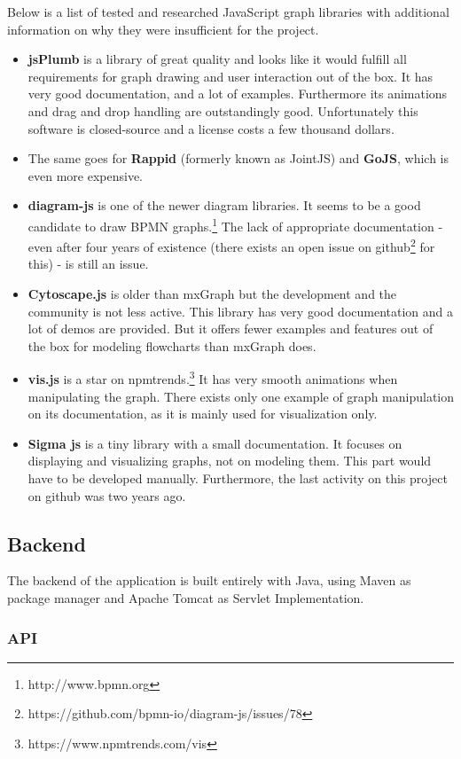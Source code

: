 \documentclass[a4paper,top=25mm,bottom=25mm,12pt,pdftex,halfparskip,twoside,openany,bibtotoc,numbers=noenddot]{scrbook}
\begin{document}
Below is a list of tested and researched JavaScript graph libraries with additional information on why they were insufficient for the project.
\begin{itemize}
	\item \textbf{jsPlumb} is a library of great quality and looks like it would fulfill all  requirements for graph drawing and user interaction out of the box. It has very good documentation, and a lot of examples. Furthermore its animations and drag and drop handling are outstandingly good. Unfortunately this software is closed-source and a license costs a few thousand dollars.
	\item The same goes for \textbf{Rappid} (formerly known as JointJS) and \textbf{GoJS}, which is even more expensive.
	\item \textbf{diagram-js} is one of the newer diagram libraries. It seems to be a good candidate to draw BPMN graphs.\footnote{http://www.bpmn.org} The lack of appropriate documentation - even after four years of existence (there exists an open issue on github\footnote{https://github.com/bpmn-io/diagram-js/issues/78} for this) - is still an issue.
	\item \textbf{Cytoscape.js} is older than mxGraph but the development and the community is not less active. This library has very good documentation and a lot of demos are provided. But it offers fewer examples and features out of the box for modeling flowcharts than mxGraph does.
	\item \textbf{vis.js} is a star on npmtrends.\footnote{https://www.npmtrends.com/vis}  It has very smooth animations when manipulating the graph. There exists only one example of graph manipulation on its documentation, as it is mainly used for visualization only.
	\item \textbf{Sigma js} is a tiny library with a small documentation. It focuses on displaying and visualizing graphs, not on modeling them. This part would have to be developed manually. Furthermore, the last activity on this project on github was two years ago.
\end{itemize}


\subsection{Backend}

The backend  of the application is built entirely with Java, using Maven as package manager and Apache Tomcat as Servlet Implementation.

\subsubsection{API}
 
\end{document}
